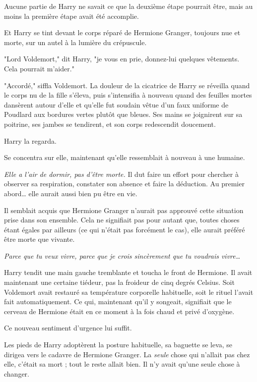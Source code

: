 Aucune partie de Harry ne savait ce que la deuxième étape pourrait être, mais au moins la première étape avait été accomplie.

Et Harry se tint devant le corps réparé de Hermione Granger, toujours nue et morte, sur un autel à la lumière du crépuscule.

"Lord Voldemort," dit Harry, "je vous en prie, donnez-lui quelques vêtements. Cela pourrait m'aider."

"Accordé," siffla Voldemort. La douleur de la cicatrice de Harry se réveilla quand le corps nu de la fille s'éleva, puis s'intensifia à nouveau quand des feuilles mortes dansèrent autour d'elle et qu'elle fut soudain vêtue d'un faux uniforme de Poudlard aux bordures vertes plutôt que bleues. Ses mains se joignirent sur sa poitrine, ses jambes se tendirent, et son corps redescendit doucement.

Harry la regarda.

Se concentra sur elle, maintenant qu'elle ressemblait à nouveau à une humaine.

\emph{Elle a l'air de dormir, pas d'être morte.}  Il dut faire un effort pour chercher à observer sa respiration, constater son absence et faire la déduction. Au premier abord… elle aurait aussi bien pu être en vie.

Il semblait acquis que Hermione Granger n'aurait pas approuvé cette situation prise dans son ensemble. Cela ne signifiait pas pour autant que, toutes choses étant égales par ailleurs (ce qui n'était pas forcément le cas), elle aurait préféré être morte que vivante.

\emph{Parce que tu veux vivre, parce que je crois sincèrement que tu voudrais vivre…} 

Harry tendit une main gauche tremblante et toucha le front de Hermione. Il avait maintenant une certaine tiédeur, pas la froideur de cinq degrés Celsius. Soit Voldemort avait restauré sa température corporelle habituelle, soit le rituel l'avait fait automatiquement. Ce qui, maintenant qu'il y songeait, signifiait que le cerveau de Hermione était en ce moment à la fois chaud et privé d'oxygène.

Ce nouveau sentiment d'urgence lui suffit.

Les pieds de Harry adoptèrent la posture habituelle, sa baguette se leva, se dirigea vers le cadavre de Hermione Granger. La \emph{seule}  chose qui n'allait pas chez elle, c'était sa mort ; tout le reste allait bien. Il n'y avait qu'une seule chose à changer.

